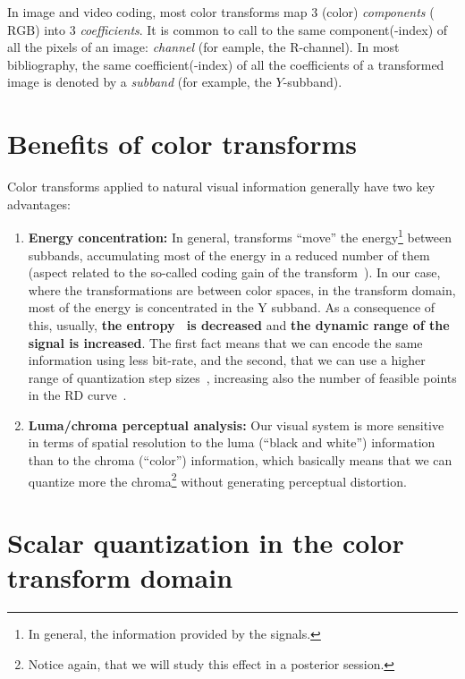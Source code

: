 In image and video coding, most color transforms map 3 (color)
\emph{components} ($\text{RGB}$) into 3 \emph{coefficients}. It is
common to call to the same component(-index) of all the pixels of an
image: \emph{channel} (for eample, the $\text{R}$-channel). In most
bibliography, the same coefficient(-index) of all the coefficients of
a transformed image is denoted by a \emph{subband} (for example, the
$Y$-subband).

\section{Benefits of color transforms}

Color transforms applied to natural visual information generally have
two key advantages:
\begin{enumerate}
\item \textbf{Energy concentration:} In general, transforms ``move''
  the energy\footnote{In general, the information provided by the
    signals.} between subbands, accumulating most of the energy in a
  reduced number of them (aspect related to the so-called coding gain
  of the transform~\cite{vruiz__transform_coding}). In our case, where
  the transformations are between color spaces, in the transform
  domain, most of the energy is concentrated in the $\text{Y}$
  subband. As a consequence of this, usually, \textbf{the
    entropy~\cite{vruiz__information_theory} is decreased} and
  \textbf{the dynamic range of the signal is increased}. The first
  fact means that we can encode the same information using less
  bit-rate, and the second, that we can use a higher range of
  quantization step
  sizes~\cite{vruiz__scalar_quantization,sayood2017introduction},
  increasing also the number of feasible points in the RD
  curve~\cite{vruiz__information_theory}.
\item \textbf{Luma/chroma perceptual analysis:} Our visual system is
  more sensitive in terms of spatial resolution to the luma (``black
  and white'') information than to the chroma (``color'') information,
  which basically means that we can quantize more the
  chroma\footnote{Notice again, that we will study this effect in a
    posterior session.} without generating perceptual distortion.
\end{enumerate}

\section{Scalar quantization in the color transform domain}

